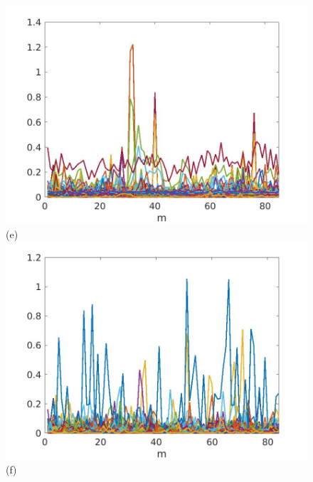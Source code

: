 \documentclass[journal]{IEEEtran}
\begin{document}
\begin{figure}[htp!]
\includegraphics[scale=.12]{../../figs/J3_VH_sqrdif_lowest_cor_locations}(e)
\includegraphics[scale=.12]{../../figs/consecdif_J3_VH_sqrdif_lowest_cor_locations}(f)


\end{figure}
\end{document}
